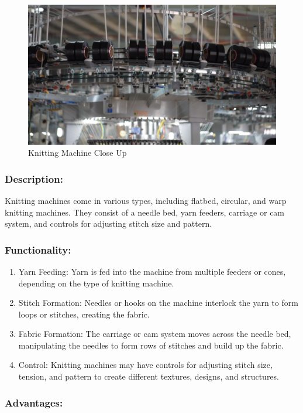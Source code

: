 \begin{figure}[h!]
  \centering
  \includegraphics[width=0.8\linewidth]{figs/knitting_closeup.jpg}
  \caption{Knitting Machine Close Up}
  \label{fig:Knitting Machine Close Up}
\end{figure}

\subsubsection{Description:}
Knitting machines come in various types, including flatbed, circular,
and warp knitting machines. They consist of a needle bed, yarn feeders,
carriage or cam system, and controls for adjusting stitch size and
pattern.


\subsubsection{Functionality:}

\begin{enumerate}
\item
  Yarn Feeding: Yarn is fed into the machine from multiple feeders or
  cones, depending on the type of knitting machine.
\item
  Stitch Formation: Needles or hooks on the machine interlock the yarn
  to form loops or stitches, creating the fabric.
\item
  Fabric Formation: The carriage or cam system moves across the needle
  bed, manipulating the needles to form rows of stitches and build up
  the fabric.
\item
  Control: Knitting machines may have controls for adjusting stitch
  size, tension, and pattern to create different textures, designs, and
  structures.
\end{enumerate}

\subsubsection{Advantages:}

